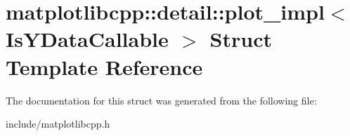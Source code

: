 \hypertarget{structmatplotlibcpp_1_1detail_1_1plot__impl}{}\section{matplotlibcpp\+:\+:detail\+:\+:plot\+\_\+impl$<$ Is\+Y\+Data\+Callable $>$ Struct Template Reference}
\label{structmatplotlibcpp_1_1detail_1_1plot__impl}


The documentation for this struct was generated from the following file\+:\begin{DoxyCompactItemize}
\item 
include/matplotlibcpp.\+h\end{DoxyCompactItemize}

